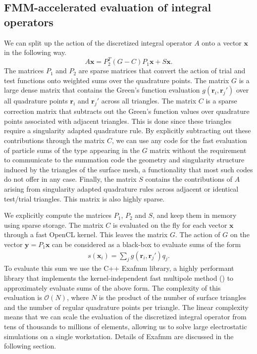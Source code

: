 \subsection{FMM-accelerated evaluation of integral operators}
We can split up the action of the discretized integral operator $A$ onto a vector $\mathbf{x}$ in the following way.
\begin{equation}
\label{eq:bempp_fmm_matvec}
A\mathbf{x} = P_2^T (G - C)P_1 \mathbf{x} + S \mathbf{x}.
\end{equation}
The matrices $P_1$ and $P_2$ are sparse matrices that convert the action of trial and test functions onto weighted sums over the quadrature points.
The matrix $G$ is a large dense matrix that contains the Green's function evaluation $g(\mathbf{r}_i, \mathbf{r}_j')$ over all quadrature points $\mathbf{r}_i$ and $\mathbf{r}_j'$ across all triangles.
The matrix $C$ is a sparse correction matrix that subtracts out the Green's function values over quadrature points associated with  adjacent triangles.
This is done since these triangles require a singularity adapted quadrature rule.
By explicitly subtracting out these contributions through the matrix $C$, we can use any code for the fast evaluation of particle sums of the type appearing in the $G$ matrix without the requirement to communicate to the summation code the geometry and singularity structure induced by the triangles of the surface mesh, a functionality that most such codes do not offer in any case.
Finally, the matrix $S$ contains the contributions of $A$ arising from singularity adapted quadrature rules across adjacent or identical test/trial triangles.
This matrix is also highly sparse.

We explicitly compute the matrices $P_1$, $P_2$ and $S$, and keep them in memory using sparse storage.
The matrix $C$ is evaluated on the fly for each vector $\mathbf{x}$ through a fast OpenCL kernel.
This leaves the matrix $G$.
The action of $G$ on the vector $\mathbf{y}=P_1 \mathbf{x}$ can be considered as a black-box to evaluate sums of the form
%
\begin{align}\label{eq:nbody_sum}
s(\mathbf{x}_i) = \sum_j g(\mathbf{r}_i, \mathbf{r}_j')q_j.
\end{align}
%
To evaluate this sum we use the C++ Exafmm library, a highly performant library that implements the kernel-independent fast multipole method (\kifmm) to approximately evaluate sums of the above form.
The complexity of this evaluation is $\mathcal{O}(N)$, where $N$ is the product of the number of surface triangles and the number of regular quadrature points per triangle.
The linear complexity means that we can scale the evaluation of the discretized integral operator from tens of thousands to millions of elements, allowing us to solve large electrostatic simulations on a single workstation. Details of Exafmm are discussed in the following section.
